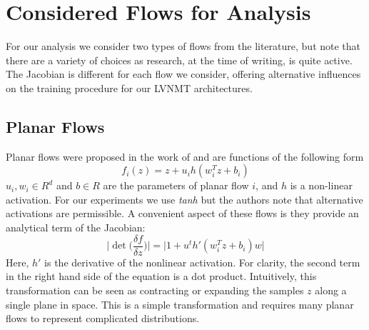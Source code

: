 


\section{Considered Flows for Analysis}

For our analysis we consider two types of flows from the literature, but note that there are a variety of choices as research, at the time of writing, is quite active. The Jacobian is different for each flow we consider, offering alternative influences on the training procedure for our \ac{LVNMT} architectures. 

\subsection{Planar Flows}

Planar flows were proposed in the work of \citet{rezende2015VIwithNF} and are functions of the following form
\begin{equation}
f_{i}(z) = z + u_{i} h(w_{i}^{T} z + b_{i})
\end{equation}
$u_{i}, w_{i} \in R^{d}$ and $b \in R$ are the parameters of planar flow $i$, and $h$ is a non-linear activation. For our experiments we use \textit{tanh} but the authors note that alternative activations are permissible. A convenient aspect of these flows is they provide an analytical term of the Jacobian:
\begin{equation}
\bigg| \det \bigg( \frac{\delta f}{\delta z} \bigg)\bigg|  = \bigg| 1 + u^{t} h'(w_{i}^{T} z + b_{i})w \bigg|
\end{equation} 
Here, $h'$ is the derivative of the nonlinear activation. For clarity, the second term in the right hand side of the equation is a dot product. Intuitively, this transformation can be seen as contracting or expanding the samples $z$ along a single plane in space. This is a simple transformation and requires many planar flows to represent complicated distributions.  %

